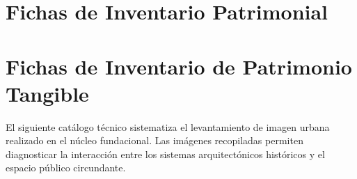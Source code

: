 \section{Fichas de Inventario Patrimonial}
\label{anexo:fichas}

\newpage
\section{Fichas de Inventario de Patrimonio Tangible}
\label{anexo:ficha-parroquia}

El siguiente catálogo técnico sistematiza el levantamiento de imagen urbana realizado en el núcleo 
fundacional. Las imágenes recopiladas permiten diagnosticar la interacción entre los sistemas 
arquitectónicos históricos y el espacio público circundante.


